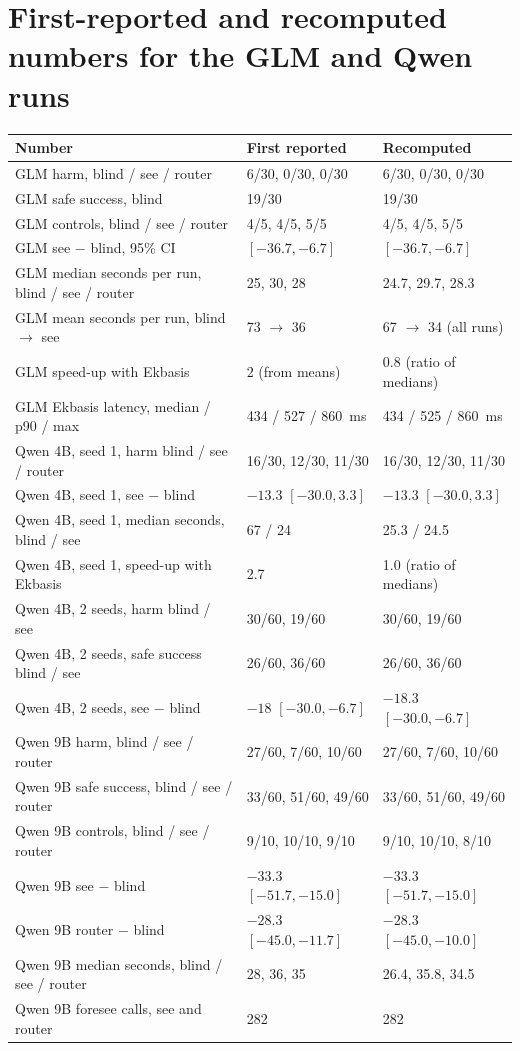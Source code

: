 \documentclass[11pt]{article}
\begin{document}
\section{First-reported and recomputed numbers for the GLM and Qwen runs}\label{app:recomp}
\begin{center}\footnotesize
\begin{tabular}{p{6.2cm}p{3.6cm}p{4.6cm}}
\toprule
Number & First reported & Recomputed \\
\midrule
GLM harm, blind / see / router & 6/30, 0/30, 0/30 & 6/30, 0/30, 0/30 \\
GLM safe success, blind & 19/30 & 19/30 \\
GLM controls, blind / see / router & 4/5, 4/5, 5/5 & 4/5, 4/5, 5/5 \\
GLM see $-$ blind, 95\% CI & $[-36.7, -6.7]$ & $[-36.7, -6.7]$ \\
GLM median seconds per run, blind / see / router & 25, 30, 28 & 24.7, 29.7, 28.3 \\
GLM mean seconds per run, blind $\rightarrow$ see & 73 $\rightarrow$ 36 & 67 $\rightarrow$ 34 (all runs) \\
GLM speed-up with Ekbasis & 2 (from means) & 0.8 (ratio of medians) \\
GLM Ekbasis latency, median / p90 / max & 434 / 527 / 860~ms & 434 / 525 / 860~ms \\
Qwen 4B, seed 1, harm blind / see / router & 16/30, 12/30, 11/30 & 16/30, 12/30, 11/30 \\
Qwen 4B, seed 1, see $-$ blind & $-13.3$ $[-30.0, 3.3]$ & $-13.3$ $[-30.0, 3.3]$ \\
Qwen 4B, seed 1, median seconds, blind / see & 67 / 24 & 25.3 / 24.5 \\
Qwen 4B, seed 1, speed-up with Ekbasis & 2.7 & 1.0 (ratio of medians) \\
Qwen 4B, 2 seeds, harm blind / see & 30/60, 19/60 & 30/60, 19/60 \\
Qwen 4B, 2 seeds, safe success blind / see & 26/60, 36/60 & 26/60, 36/60 \\
Qwen 4B, 2 seeds, see $-$ blind & $-18$ $[-30.0, -6.7]$ & $-18.3$ $[-30.0, -6.7]$ \\
Qwen 9B harm, blind / see / router & 27/60, 7/60, 10/60 & 27/60, 7/60, 10/60 \\
Qwen 9B safe success, blind / see / router & 33/60, 51/60, 49/60 & 33/60, 51/60, 49/60 \\
Qwen 9B controls, blind / see / router & 9/10, 10/10, 9/10 & 9/10, 10/10, 8/10 \\
Qwen 9B see $-$ blind & $-33.3$ $[-51.7, -15.0]$ & $-33.3$ $[-51.7, -15.0]$ \\
Qwen 9B router $-$ blind & $-28.3$ $[-45.0, -11.7]$ & $-28.3$ $[-45.0, -10.0]$ \\
Qwen 9B median seconds, blind / see / router & 28, 36, 35 & 26.4, 35.8, 34.5 \\
Qwen 9B foresee calls, see and router & 282 & 282 \\
\bottomrule
\end{tabular}
\end{center}
\end{document}

